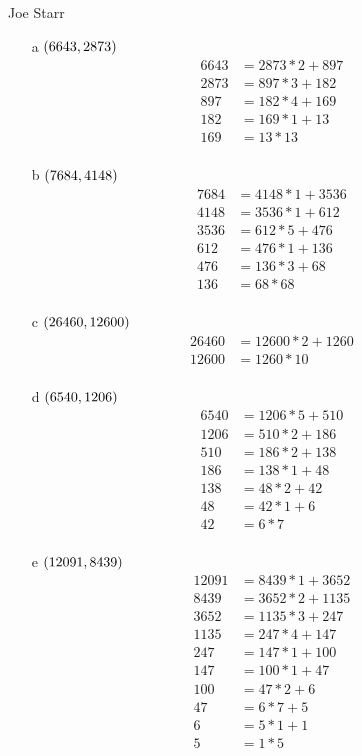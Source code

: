 \begin{mdframed}[style=darkAnswer]
Joe Starr\\
\begin{itemize}
    \item [a] {$\left(6643,2873\right)$
    \begin{align*}
        6643&=2873*2+897\\
        2873&=897*3+182\\
        897&=182*4+169\\
        182&=169*1+13\\
        169&=13*13\\
    \end{align*}
    }
    \item [b] {$\left(7684,4148\right)$
    \begin{align*}
        7684&=4148*1+3536\\
        4148&=3536*1+612\\
        3536&=612*5+476\\
        612&=476*1+136\\
        476&=136*3+68\\
        136&=68*68\\
    \end{align*}
    }
    \item [c] {$\left(26460,12600\right)$
    \begin{align*}
        26460&=12600*2+1260\\
        12600&=1260*10\\
    \end{align*}
    }
    \item [d] {$\left(6540,1206\right)$
    \begin{align*}
        6540&=1206*5+510\\
        1206&=510*2+186\\
        510&=186*2+138\\
        186&=138*1+48\\
        138&=48*2+42\\
        48&=42*1+6\\
        42&=6*7\\
    \end{align*}
    }
    \item [e] {$\left(12091,8439\right)$
    \begin{align*}
        12091&=8439*1+3652\\
        8439&=3652*2+1135\\
        3652&=1135*3+247\\
        1135&=247*4+147\\
        247&=147*1+100\\
        147&=100*1+47\\
        100&=47*2+6\\
        47&=6*7+5\\
        6&=5*1+1\\
        5&=1*5\\
    \end{align*}
    }
\end{itemize}
\end{mdframed}
